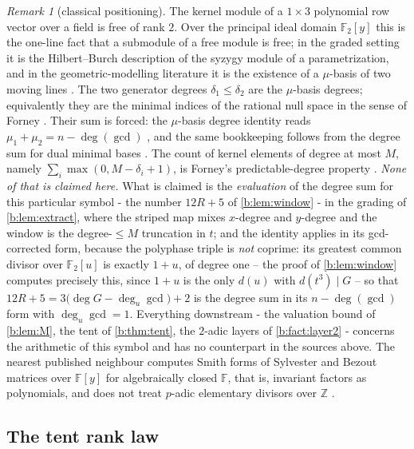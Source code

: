 \documentclass[11pt]{amsart}
\theoremstyle{definition}
\theoremstyle{remark}
\newtheorem{remark}[theorem]{Remark}
\begin{document}
\begin{remark}[classical positioning]
\label{b:rem:mu}
The kernel module of a $1 \times 3$ polynomial row vector over a field is free of rank $2$. Over the principal ideal domain $\mathbb{F}_2[y]$ this is the one-line fact that a submodule of a free module is free; in the graded setting it is the Hilbert--Burch description of the syzygy module of a parametrization, and in the geometric-modelling literature it is the existence of a $\mu$-basis of two moving lines \cite{csc98,dohm}. The two generator degrees $\delta_1 \le \delta_2$ are the $\mu$-basis degrees; equivalently they are the minimal indices of the rational null space in the sense of Forney \cite{forney,dopico}. Their sum is forced: the $\mu$-basis degree identity reads $\mu_1 + \mu_2 = n - \deg(\gcd)$ \cite[Thm.~1]{dohm}, and the same bookkeeping follows from the degree sum for dual minimal bases \cite[Thm.~2.6]{dopico}. The count of kernel elements of degree at most $M$, namely $\sum_i \max(0, M - \delta_i + 1)$, is Forney's predictable-degree property \cite{forney}. \emph{None of that is claimed here.} What is claimed is the \emph{evaluation} of the degree sum for this particular symbol - the number $12R+5$ of \cref{b:lem:window} - in the grading of \cref{b:lem:extract}, where the striped map mixes $x$-degree and $y$-degree and the window is the degree-$\le M$ truncation in $t$; and the identity applies in its gcd-corrected form, because the polyphase triple is \emph{not} coprime: its greatest common divisor over $\mathbb{F}_2[u]$ is exactly $1+u$, of degree one -- the proof of \cref{b:lem:window} computes precisely this, since $1+u$ is the only $d(u)$ with $d(t^3) \mid G$ -- so that $12R+5 = 3\bigl(\deg G - \deg_u\gcd\bigr) + 2$ is the degree sum in its $n - \deg(\gcd)$ form with $\deg_u\gcd = 1$. Everything downstream - the valuation bound of \cref{b:lem:M}, the tent of \cref{b:thm:tent}, the $2$-adic layers of \cref{b:fact:layer2} - concerns the arithmetic of this symbol and has no counterpart in the sources above. The nearest published neighbour computes Smith forms of Sylvester and Bezout matrices over $\mathbb{F}[y]$ for algebraically closed $\mathbb{F}$, that is, invariant factors as polynomials, and does not treat $p$-adic elementary divisors over $\mathbb{Z}$ \cite{lindy}.
\end{remark}

\subsection*{The tent rank law}
\end{document}
